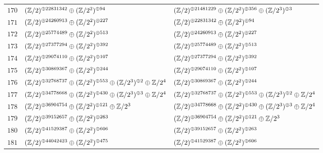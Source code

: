 \begin{supertabular}{|c|p{5.5cm}|p{5.5cm}|}
$170$%
&$(\mathbb{Z}/2)^{\oplus22831342}\oplus(\mathbb{Z}/2^{2})^{\oplus94}$%
&$(\mathbb{Z}/2)^{\oplus21481229}\oplus(\mathbb{Z}/2^{2})^{\oplus356}\oplus(\mathbb{Z}/2^{3})^{\oplus3}$\\

$171$%
&$(\mathbb{Z}/2)^{\oplus24260913}\oplus(\mathbb{Z}/2^{2})^{\oplus227}$%
&$(\mathbb{Z}/2)^{\oplus22831342}\oplus(\mathbb{Z}/2^{2})^{\oplus94}$\\

$172$%
&$(\mathbb{Z}/2)^{\oplus25774489}\oplus(\mathbb{Z}/2^{2})^{\oplus513}$%
&$(\mathbb{Z}/2)^{\oplus24260913}\oplus(\mathbb{Z}/2^{2})^{\oplus227}$\\

$173$%
&$(\mathbb{Z}/2)^{\oplus27377294}\oplus(\mathbb{Z}/2^{2})^{\oplus392}$%
&$(\mathbb{Z}/2)^{\oplus25774489}\oplus(\mathbb{Z}/2^{2})^{\oplus513}$\\

$174$%
&$(\mathbb{Z}/2)^{\oplus29074110}\oplus(\mathbb{Z}/2^{2})^{\oplus107}$%
&$(\mathbb{Z}/2)^{\oplus27377294}\oplus(\mathbb{Z}/2^{2})^{\oplus392}$\\

$175$%
&$(\mathbb{Z}/2)^{\oplus30869367}\oplus(\mathbb{Z}/2^{2})^{\oplus244}$%
&$(\mathbb{Z}/2)^{\oplus29074110}\oplus(\mathbb{Z}/2^{2})^{\oplus107}$\\

$176$%
&$(\mathbb{Z}/2)^{\oplus32768737}\oplus(\mathbb{Z}/2^{2})^{\oplus553}\oplus(\mathbb{Z}/2^{3})^{\oplus2}\oplus\mathbb{Z}/2^{4}$%
&$(\mathbb{Z}/2)^{\oplus30869367}\oplus(\mathbb{Z}/2^{2})^{\oplus244}$\\

$177$%
&$(\mathbb{Z}/2)^{\oplus34778668}\oplus(\mathbb{Z}/2^{2})^{\oplus430}\oplus(\mathbb{Z}/2^{3})^{\oplus3}\oplus\mathbb{Z}/2^{4}$%
&$(\mathbb{Z}/2)^{\oplus32768737}\oplus(\mathbb{Z}/2^{2})^{\oplus553}\oplus(\mathbb{Z}/2^{3})^{\oplus2}\oplus\mathbb{Z}/2^{4}$\\

$178$%
&$(\mathbb{Z}/2)^{\oplus36904754}\oplus(\mathbb{Z}/2^{2})^{\oplus121}\oplus\mathbb{Z}/2^{3}$%
&$(\mathbb{Z}/2)^{\oplus34778668}\oplus(\mathbb{Z}/2^{2})^{\oplus430}\oplus(\mathbb{Z}/2^{3})^{\oplus3}\oplus\mathbb{Z}/2^{4}$\\

$179$%
&$(\mathbb{Z}/2)^{\oplus39152657}\oplus(\mathbb{Z}/2^{2})^{\oplus263}$%
&$(\mathbb{Z}/2)^{\oplus36904754}\oplus(\mathbb{Z}/2^{2})^{\oplus121}\oplus\mathbb{Z}/2^{3}$\\

$180$%
&$(\mathbb{Z}/2)^{\oplus41529387}\oplus(\mathbb{Z}/2^{2})^{\oplus606}$%
&$(\mathbb{Z}/2)^{\oplus39152657}\oplus(\mathbb{Z}/2^{2})^{\oplus263}$\\

$181$%
&$(\mathbb{Z}/2)^{\oplus44042423}\oplus(\mathbb{Z}/2^{2})^{\oplus475}$%
&$(\mathbb{Z}/2)^{\oplus41529387}\oplus(\mathbb{Z}/2^{2})^{\oplus606}$\\


\end{supertabular}

